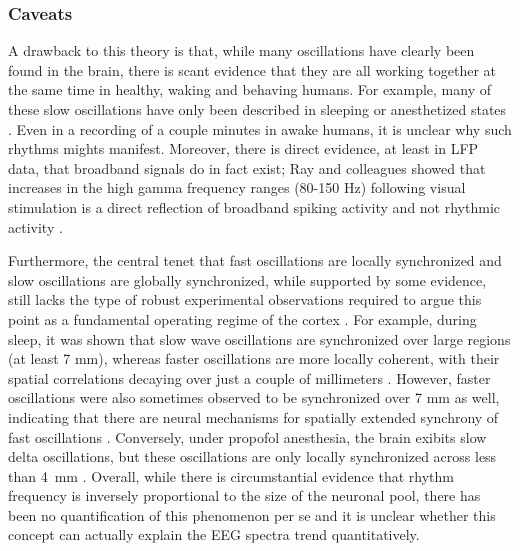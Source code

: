 \subsubsection{Caveats}
A drawback to this theory is that, while many oscillations have clearly been found in the brain, there is scant evidence that they are all working together at the same time in healthy, waking and behaving humans. For example, many of these slow oscillations have only been described in sleeping or anesthetized states \cite{Hromadka2013}. Even in a recording of a couple minutes in awake humans, it is unclear why such rhythms mights manifest. Moreover, there is direct evidence, at least in LFP data, that broadband signals do in fact exist; Ray and colleagues showed that increases in the high gamma frequency ranges (80-150 Hz) following visual stimulation is a direct reflection of broadband spiking activity and not rhythmic activity \cite{Ray2008,Ray2011}. 

Furthermore, the central tenet that fast oscillations are locally synchronized and slow oscillations are globally synchronized, while supported by some evidence, still lacks the type of robust experimental observations required to argue this point as a fundamental operating regime of the cortex \cite{Buzsaki2006}. For example, during sleep, it was shown that slow wave oscillations are synchronized over large regions (at least 7 mm), whereas faster oscillations are more locally coherent, with their spatial correlations decaying over just a couple of millimeters \cite{Destexhe1999}. However, faster oscillations were also sometimes observed to be synchronized over 7 mm as well, indicating that there are neural mechanisms for spatially extended synchrony of fast oscillations \cite{Destexhe1999}. Conversely, under propofol anesthesia, the brain exibits slow delta oscillations, but these oscillations are only locally synchronized across less than \qty{4}{\milli\meter} \cite{Lewis2012}. Overall, while there is circumstantial evidence that rhythm frequency is inversely proportional to the size of the neuronal pool, there has been no quantification of this phenomenon per se and it is unclear whether this concept can actually explain the EEG spectra trend quantitatively.

